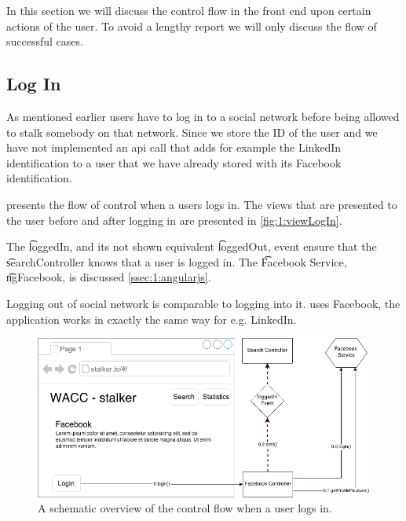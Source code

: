 In this section we will discuss the control flow in the front end upon certain actions of the user. To avoid a lengthy report we will only discuss the flow of successful cases.

\subsection{Log In}
\label{ss:1:login}
	As mentioned earlier users have to log in to a social network before being allowed to stalk somebody on that network. Since we store the ID of the user and we have not implemented an api call that adds for example the LinkedIn identification to a user that we have already stored with its Facebook identification.

	 presents the flow of control when a users logs in. The views that are presented to the user before and after logging in are presented in \cref{fig:1:viewLogIn}.

	The \t{loggedIn}, and its not shown equivalent \t{loggedOut}, event ensure that the \t{searchController} knows that a user is logged in. The \t{Facebook Service}, \t{ngFacebook}, is discussed \vref{ssec:1:angularjs}. 

	Logging out of social network is comparable to logging into it.  uses Facebook, the application works in exactly the same way for e.g. LinkedIn.

	\begin{figure}
		\includegraphics[width=\textwidth]{./img/1_login_flow}
		\caption{A schematic overview of the control flow when a user logs in.}
		\label{fig:1:controlflowLogIn}
	\end{figure}

